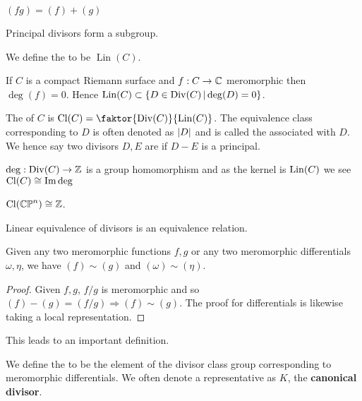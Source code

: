 \documentclass{article}
\begin{document}
\begin{lemma}$(fg) = (f)+(g)$
\end{lemma}
\begin{corollary}
	Principal divisors form a subgroup. 
\end{corollary}
\begin{definition}
	We define the  to be $\operatorname{Lin}(C)$. 
\end{definition}

\begin{prop}
	If $C$ is a compact Riemann surface and $f:C \to \mathbb{C}$ meromorphic then $\deg(f) = 0$. Hence $\operatorname{Lin}(C) \subset \left\{ D \in \operatorname{Div}(C) \, | \deg(D) = 0 \right\}$. 
\end{prop}

\begin{definition}
	The  of $C$ is $\Cl(C) = \faktor{\Div(C)}{\Lin(C)}$. The equivalence class corresponding to $D$ is often denoted as $\left\lvert D \right\rvert$ and is called the  associated with $D$. We hence say two divisors $D,E$ are  if $D-E$ is a principal.
\end{definition}

\begin{remark}
	$\deg: \operatorname{Div}(C) \to \mathbb{Z}$ is a group homomorphism and as the kernel is $\operatorname{Lin}(C)$ we see $\operatorname{Cl}(C) \cong \operatorname{Im} \deg$
\end{remark}
\begin{corollary}
	$\operatorname{Cl}(\mathbb{CP}^n) \cong \mathbb{Z}$. 
\end{corollary}

\begin{lemma}
	Linear equivalence of divisors is an equivalence relation. 
\end{lemma}

\begin{prop}
	Given any two meromorphic functions $f,g$ or any two meromorphic differentials $\omega,\eta$, we have $(f) \sim (g)$ and $(\omega) \sim (\eta)$. 
\end{prop}
\begin{proof}
	Given $f,g$, $f/g$ is meromorphic and so $(f)-(g) = (f/g) \Rightarrow (f) \sim (g)$. The proof for differentials is likewise taking a local representation. 
\end{proof}

This leads to an important definition. 

\begin{definition}
	We define the  to be the element of the divisor class group corresponding to meromorphic differentials. We often denote a representative as $K$, the \textbf{canonical divisor}.
\end{definition}
\end{document}
